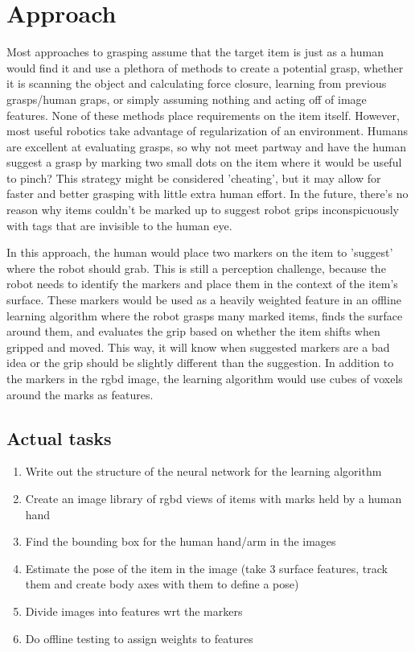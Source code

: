 \documentclass[10pt]{article}
\begin{document}
\section{Approach} \label{sec:approach}
Most approaches to grasping assume that the target item is just as a human would find it and use a plethora of methods to create a potential grasp, whether it is scanning the object and calculating force closure, learning from previous grasps/human graps, or simply assuming nothing and acting off of image features. None of these methods place requirements on the item itself. However, most useful robotics take advantage of regularization of an environment. Humans are excellent at evaluating grasps, so why not meet partway and have the human suggest a grasp by marking two small dots on the item where it would be useful to pinch? This strategy might be considered 'cheating', but it may allow for faster and better grasping with little extra human effort. In the future, there's no reason why items couldn't be marked up to suggest robot grips inconspicuously with tags that are invisible to the human eye. 

 In this approach, the human would place two markers on the item to 'suggest' where the robot should grab. This is still a perception challenge, because the robot needs to identify the markers and place them in the context of the item's surface. These markers would be used as a heavily weighted feature in an offline learning algorithm where the robot grasps many marked items, finds the surface around them, and evaluates the grip based on whether the item shifts when gripped and moved. This way, it will know when suggested markers are a bad idea or the grip should be slightly different than the suggestion. In addition to the markers in the rgbd image, the learning algorithm would use cubes of voxels around the marks as features.
 
 \subsection{Actual tasks}
 \begin{enumerate}
 \item Write out the structure of the neural network for the learning algorithm
 \item Create an image library of rgbd views of items with marks held by a human hand
 \item Find the bounding box for the human hand/arm in the images
 \item Estimate the pose of the item in the image (take 3 surface features, track them and create body axes with them to define a pose)
 \item Divide images into features wrt the markers
 \item Do offline testing to assign weights to features
\end{enumerate} 
\nocite{*} 
 


 
\end{document}

